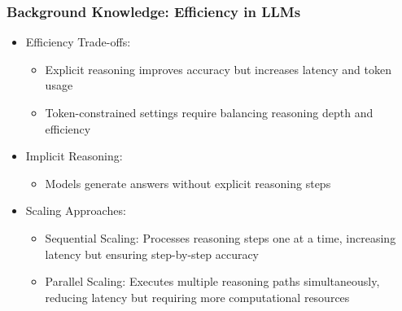 \documentclass[student, noshadow, lsr, english, aspectratio=169]{ITR_LSR_slides}
\begin{document}
\begin{frame}
    \frametitle{Background Knowledge: Efficiency in LLMs}
    \begin{itemize}
        \item Efficiency Trade-offs:
            \begin{itemize}
                \item Explicit reasoning improves accuracy but increases latency and token usage
                \item Token-constrained settings require balancing reasoning depth and efficiency
            \end{itemize}
        \item Implicit Reasoning:
            \begin{itemize}
                \item Models generate answers without explicit reasoning steps
            \end{itemize}
        \item Scaling Approaches:
            \begin{itemize}
                \item Sequential Scaling: Processes reasoning steps one at a time, increasing latency but ensuring step-by-step accuracy
                \item Parallel Scaling: Executes multiple reasoning paths simultaneously, reducing latency but requiring more computational resources
            \end{itemize}
    \end{itemize}
\end{frame}
\end{document}
